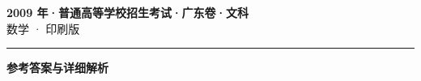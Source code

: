 \documentclass[zihao=5, a4paper]{ctexart}
\begin{document}
\begin{center}
  {\Large\bfseries 2009 年·普通高等学校招生考试·广东卷·文科}\\[4pt]
  {\large 数学 · 印刷版}
\end{center}
\medskip
{}

\par\bigskip\hrule\bigskip
{}
\begin{center}{\large\bfseries 参考答案与详细解析}\end{center}
\smallskip

\end{document}
